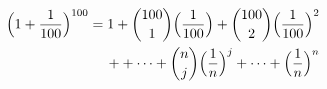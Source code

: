 \documentclass[preview]{standalone}
\begin{document}
\begin{align*}
\Big( 1 + {1 \over 100}\Big)^{100} = 1 + {100 \choose 1} \Big( {1 \over 100} \Big) + {100 \choose 2} \Big( {1 \over 100} \Big)^2 \\+ + \cdots + {n \choose j} \Big( {1 \over n} \Big)^j + \cdots + \Big( {1 \over n} \Big)^n
\end{align*}
\end{document}
